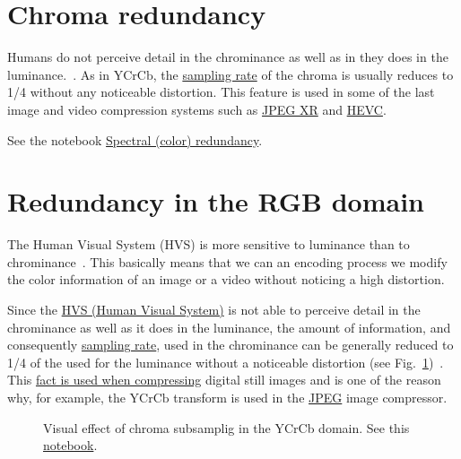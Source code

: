 \section{Chroma redundancy}

Humans do not perceive detail in the chrominance as well as in they
does in the
luminance.~\cite{burger2016digital}. As in
$\text{YCrCb}$, the
\href{https://en.wikipedia.org/wiki/Sampling_(signal_processing)}{sampling
  rate} of the chroma is usually reduces to 1/4 without any noticeable
distortion. This feature is used in some of the last image and video
compression systems such as
\href{https://en.wikipedia.org/wiki/JPEG_XR#Description}{JPEG XR} and
\href{https://en.wikipedia.org/wiki/High_Efficiency_Video_Coding#Video_coding_layer}{HEVC}.

See the notebook
\href{https://github.com/vicente-gonzalez-ruiz/color_transforms/blob/main/docs/color_redundancy.ipynb}{Spectral
  (color) redundancy}.

\section{Redundancy in the RGB domain}

The Human Visual System (HVS) is more sensitive to luminance than to
chrominance~\cite{vruiz__visual_redundancy}. This basically means that
we can an encoding process we modify the color information of an image
or a video without noticing a high distortion.

Since the \href{https://en.wikipedia.org/wiki/Visual_system}{HVS
  (Human Visual System)} is not able to perceive detail in the
chrominance as well as it does in the luminance, the amount of
information, and consequently
\href{https://en.wikipedia.org/wiki/Sampling_(signal_processing)}{sampling
  rate}, used in the chrominance can be generally reduced to 1/4 of
the used for the luminance without a noticeable distortion (see
Fig.~\ref{fig:san-diego_chroma_subsampled})~\cite{burger2016digital}. This
\href{https://en.wikipedia.org/wiki/Bandwidth_(computing)}{fact is
  used when compressing} digital still images and is one of the reason
why, for example, the $\text{YCrCb}$ transform is used in the
\href{https://en.wikipedia.org/wiki/JPEG}{JPEG} image compressor.


\begin{figure}
  \centering
  \caption{Visual effect of chroma subsamplig in the YCrCb domain. See
    this
    \href{https://github.com/Sistemas-Multimedia/Sistemas-Multimedia.github.io/blob/master/milestones/06-YUV_compression/chroma_subsampling.ipynb}{notebook}.}
  \label{fig:san-diego_chroma_subsampled}
\end{figure}

